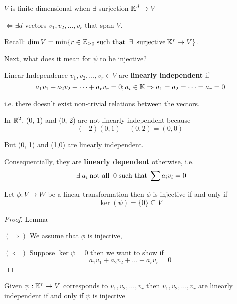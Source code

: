 \begin{remark}
    \(V\) is finite dimensional when \(\exists\) surjection \(\mathbb{K}^d \to V\)

    \(\Leftrightarrow \exists d\) vectors \(v_1, v_2, \dots, v_r\) that span \(V\).

    Recall: \(\dim V = \min\{r \in \bbz_{\geq 0} \st \exists \:\text{surjective}\: \bbk^r \to V\}\).

    Next, what does it mean for \(\psi\) to be injective?
\end{remark}

\begin{definition} {Linear Independence}
    \(v_1, v_2, \dots, v_r \in V\) are \textbf{linearly independent} if \[
        a_1v_1 + a_2v_2 + \cdots + a_rv_r = 0; a_i \in \mathbb{K} \Rightarrow a_1 = a_2 = \cdots = a_r = 0
    \]

    i.e. there doesn't exist non-trivial relations between the vectors.
\end{definition}

\begin{example}
    In \(\mathbb{R}^2\), (0, 1) and (0, 2) are not linearly independent because \[
        (-2) (0, 1) + (0, 2) = (0, 0)
    \]

    But (0, 1) and (1,0) are linearly independent.
\end{example}

Consequentially, they are \textbf{linearly dependent} otherwise, i.e. \[
    \exists a_i \:\text{not all }\: 0 \st \sum a_iv_i = 0
\]

\begin{lemma}
    Let \(\phi: V \to W\) be a linear transformation then \(\phi\) is injective if and only if \[
    \ker(\psi) = \{0\} \subseteq V
    \]
\end{lemma}

\begin{proof} {Lemma}
    \hfill

    \((\Rightarrow)\) We assume that \(\phi\) is injective,
    
    \((\Leftarrow)\) Suppose \(\ker{\psi} = 0\) then we want to show if \[
    a_1v_1 + a_2v_2 + \dots + a_rv_r = 0
    \]
\end{proof}
\begin{lemma}
    Given \(\psi: \mathbb{K}^r \to V\) corresponds to \(v_1, v_2, \dots, v_r\) then \(v_1, v_2, \dots, v_r\) are linearly independent if and only if \(\psi\) is injective
\end{lemma}